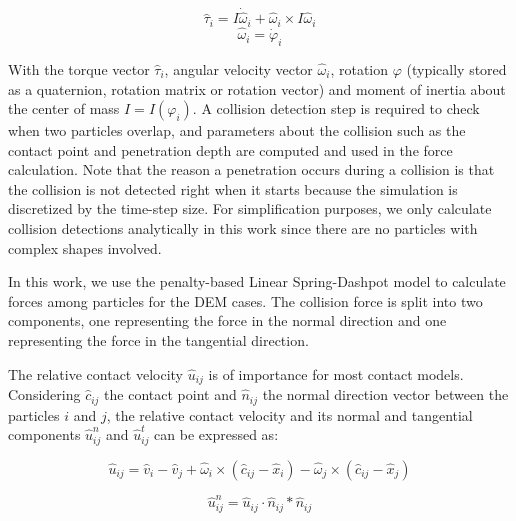 \documentclass[preprint,12pt]{elsarticle}
\begin{document}
\begin{equation}
    \hat{\tau}{_i} = I \dot{\hat \omega}_i + {\hat \omega}_i \times I {\hat \omega}_i \label{eq:newton_torque}
\end{equation}
\begin{equation}
    \hat{\omega}{_i} = \dot{\varphi}_i \label{eq:newton_angular_velocity}
\end{equation}

With the torque vector $\hat{\tau}{_i}$, angular velocity vector $\hat{\omega}{_i}$, rotation $\varphi$ (typically stored as a quaternion, rotation matrix or rotation vector) and moment of inertia about the center of mass $I = I(\varphi_i)$.
A collision detection step is required to check when two particles overlap, and parameters about the collision such as the contact point and penetration depth are computed and used in the force calculation.
Note that the reason a penetration occurs during a collision is that the collision is not detected right when it starts because the simulation is discretized by the time-step size.
For simplification purposes, we only calculate collision detections analytically in this work since there are no particles with complex shapes involved.

In this work, we use the penalty-based Linear Spring-Dashpot model to calculate forces among particles for the DEM cases.
The collision force is split into two components, one representing the force in the normal direction and one representing the force in the tangential direction.

The relative contact velocity $\hat{u}_{ij}$ is of importance for most contact models.
Considering $\hat{c}_{ij}$ the contact point and $\hat{n}_{ij}$ the normal direction vector between the particles $i$ and $j$, the relative contact velocity and its normal and tangential components $\hat{u}_{ij}^{n}$ and $\hat{u}_{ij}^{t}$ can be expressed as:


\begin{equation}
    \hat{u}_{ij} = \hat{v}_{i} - \hat{v}_{j} + \hat{\omega}_{i} \times (\hat{c}_{ij} - \hat{x}_{i}) - \hat{\omega}_{j} \times (\hat{c}_{ij} - \hat{x}_{j})
    \label{eq:relative_contact_velocity}
\end{equation}

\begin{equation}
    \hat{u}_{ij}^{n} = \hat{u}_{ij} \cdot \hat{n}_{ij} * \hat{n}_{ij}
    \label{eq:relative_contact_velocity_n}
\end{equation}
\end{document}
